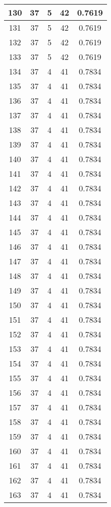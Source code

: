 \documentclass[letterpaper, 12pt]{article}
\begin{document}
\begin{longtable}{|c|c|c|c|c|}
\hline
130 & 37 & 5 & 42 & 0.7619 \\
\hline
131 & 37 & 5 & 42 & 0.7619 \\
\hline
132 & 37 & 5 & 42 & 0.7619 \\
\hline
133 & 37 & 5 & 42 & 0.7619 \\
\hline
134 & 37 & 4 & 41 & 0.7834 \\
\hline
135 & 37 & 4 & 41 & 0.7834 \\
\hline
136 & 37 & 4 & 41 & 0.7834 \\
\hline
137 & 37 & 4 & 41 & 0.7834 \\
\hline
138 & 37 & 4 & 41 & 0.7834 \\
\hline
139 & 37 & 4 & 41 & 0.7834 \\
\hline
140 & 37 & 4 & 41 & 0.7834 \\
\hline
141 & 37 & 4 & 41 & 0.7834 \\
\hline
142 & 37 & 4 & 41 & 0.7834 \\
\hline
143 & 37 & 4 & 41 & 0.7834 \\
\hline
144 & 37 & 4 & 41 & 0.7834 \\
\hline
145 & 37 & 4 & 41 & 0.7834 \\
\hline
146 & 37 & 4 & 41 & 0.7834 \\
\hline
147 & 37 & 4 & 41 & 0.7834 \\
\hline
148 & 37 & 4 & 41 & 0.7834 \\
\hline
149 & 37 & 4 & 41 & 0.7834 \\
\hline
150 & 37 & 4 & 41 & 0.7834 \\
\hline
151 & 37 & 4 & 41 & 0.7834 \\
\hline
152 & 37 & 4 & 41 & 0.7834 \\
\hline
153 & 37 & 4 & 41 & 0.7834 \\
\hline
154 & 37 & 4 & 41 & 0.7834 \\
\hline
155 & 37 & 4 & 41 & 0.7834 \\
\hline
156 & 37 & 4 & 41 & 0.7834 \\
\hline
157 & 37 & 4 & 41 & 0.7834 \\
\hline
158 & 37 & 4 & 41 & 0.7834 \\
\hline
159 & 37 & 4 & 41 & 0.7834 \\
\hline
160 & 37 & 4 & 41 & 0.7834 \\
\hline
161 & 37 & 4 & 41 & 0.7834 \\
\hline
162 & 37 & 4 & 41 & 0.7834 \\
\hline
163 & 37 & 4 & 41 & 0.7834 \\

\end{longtable}
\end{document}
